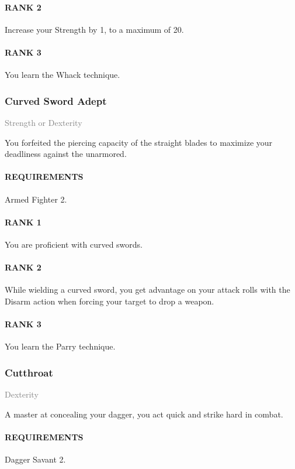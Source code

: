 \paragraph{RANK 2} Increase your Strength by 1, to a maximum of 20.
\paragraph{RANK 3} You learn the Whack technique.

\subsubsection{Curved Sword Adept} \label{tal::curvedswordadept}
\small{\textcolor{gray}{Strength or Dexterity}}

\normalsize
You forfeited the piercing capacity of the straight blades to maximize your deadliness against the unarmored.
\paragraph{REQUIREMENTS} Armed Fighter 2.
\paragraph{RANK 1} You are proficient with curved swords.
\paragraph{RANK 2} While wielding a curved sword, you get advantage on your attack rolls with the Disarm action when forcing your target to drop a weapon.
\paragraph{RANK 3} You learn the Parry technique.

\subsubsection{Cutthroat} \label{tal::cutthroat}
\small{\textcolor{gray}{Dexterity}}

\normalsize
A master at concealing your dagger, you act quick and strike hard in combat.
\paragraph{REQUIREMENTS} Dagger Savant 2.
